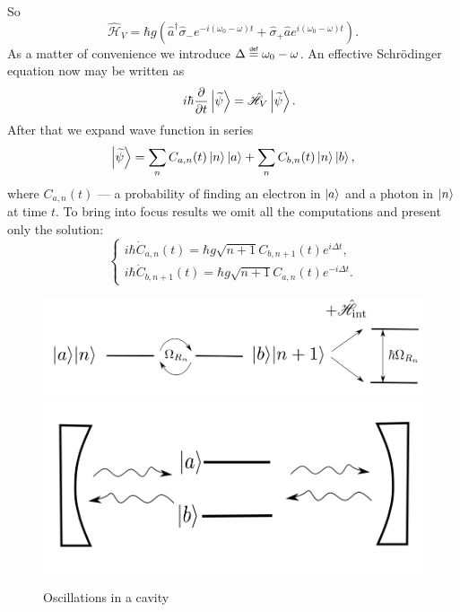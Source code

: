 So
\begin{equation}
	\hat{\mathscr{H}}_V = \hbar g \left( \hat{a}^{\dagger} \hat{\sigma}_- e^{-i (\omega_0 - \omega)t} + \hat{\sigma}_+ \hat{a} e^{i (\omega_0 - \omega)t} \right).
\end{equation}
As a matter of convenience we introduce $\Delta \myeq \omega_0 - \omega$. An effective Schrödinger equation now may be written as
\begin{equation}
	\quad i \hbar \dfrac{\partial {}}{\partial {t}}\left\lvert {\widetilde{\psi}} \right\rangle = \hat{\mathscr{H}}_V \left\lvert {\widetilde{\psi}} \right\rangle.
\end{equation}
After that we expand wave function in series
\begin{equation}
	\left\lvert {\widetilde{\psi}} \right\rangle = \sum_{n} C_{a,n}(t) \left\lvert {n} \right\rangle \left\lvert {a} \right\rangle + \sum_{n} C_{b,n}(t) \left\lvert {n} \right\rangle \left\lvert {b} \right\rangle,
\end{equation}
where $C_{a,n}(t)$ --- a probability of finding an electron in $\left\lvert {a} \right\rangle$ and a photon in $\left\lvert {n} \right\rangle$ at time $t$. To bring into focus results we omit all the computations and present only the solution:
\begin{equation}
	\begin{cases}
		i \hbar \dot{C}_{a,n}(t) = \hbar g \sqrt{n+1} C_{b,n+1}(t) e^{i \Delta t}, \\
		i \hbar \dot{C}_{b,n+1}(t) = \hbar g \sqrt{n+1} C_{a,n}(t) e^{-i \Delta t}.
	\end{cases}
	\label{eq:228_botat_my_ne_brosim}
\end{equation}

\begin{figure}
	\centering
	\includegraphics[width=0.8\linewidth]{fig/L6/E_split}
	\includegraphics[width=0.5\linewidth]{fig/L6/osc_in_cavity}
	\caption{Oscillations in a cavity}
	\label{fig:228}
\end{figure}


